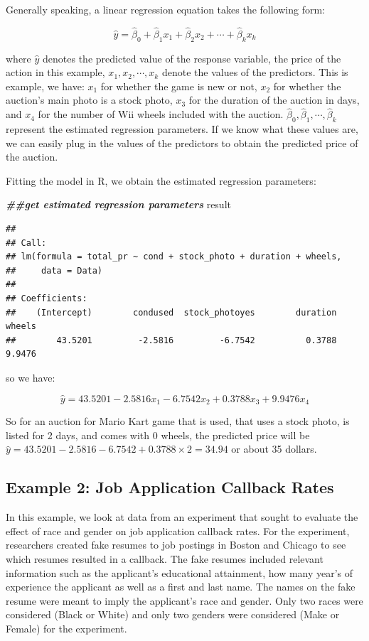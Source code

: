 \documentclass[
]{book}
\newenvironment{Shaded}{\begin{snugshade}}{\end{snugshade}}
\newcommand{\DocumentationTok}[1]{\textcolor[rgb]{0.56,0.35,0.01}{\textbf{\textit{#1}}}}
\newcommand{\NormalTok}[1]{#1}
\begin{document}
Generally speaking, a linear regression equation takes the following form:

\[
\hat{y} = \hat{\beta}_0 + \hat{\beta}_1 x_1 + \hat{\beta}_2 x_2 + \cdots + \hat{\beta}_k x_k
\]

where \(\hat{y}\) denotes the predicted value of the response variable, the price of the action in this example, \(x_1, x_2, \cdots, x_k\) denote the values of the predictors. This is example, we have: \(x_1\) for whether the game is new or not, \(x_2\) for whether the auction's main photo is a stock photo, \(x_3\) for the duration of the auction in days, and \(x_4\) for the number of Wii wheels included with the auction. \(\hat{\beta}_0, \hat{\beta}_1, \cdots, \hat{\beta}_k\) represent the estimated regression parameters. If we know what these values are, we can easily plug in the values of the predictors to obtain the predicted price of the auction.

Fitting the model in R, we obtain the estimated regression parameters:

\begin{Shaded}
\begin{Highlighting}[]
\DocumentationTok{\#\#get estimated regression parameters}
\NormalTok{result}
\end{Highlighting}
\end{Shaded}

\begin{verbatim}
## 
## Call:
## lm(formula = total_pr ~ cond + stock_photo + duration + wheels, 
##     data = Data)
## 
## Coefficients:
##    (Intercept)        condused  stock_photoyes        duration          wheels  
##        43.5201         -2.5816         -6.7542          0.3788          9.9476
\end{verbatim}

so we have:

\[
\hat{y} = 43.5201 - 2.5816 x_1 - 6.7542 x_2 + 0.3788 x_3 + 9.9476 x_4
\]

So for an auction for Mario Kart game that is used, that uses a stock photo, is listed for 2 days, and comes with 0 wheels, the predicted price will be \(\hat{y} = 43.5201 - 2.5816 - 6.7542 + 0.3788 \times 2 = 34.94\) or about 35 dollars.

\subsection{Example 2: Job Application Callback Rates}\label{eg2}

In this example, we look at data from an experiment that sought to evaluate the effect of race and gender on job application callback rates. For the experiment, researchers created fake resumes to job postings in Boston and Chicago to see which resumes resulted in a callback. The fake resumes included relevant information such as the applicant's educational attainment, how many year's of experience the applicant as well as a first and last name. The names on the fake resume were meant to imply the applicant's race and gender. Only two races were considered (Black or White) and only two genders were considered (Make or Female) for the experiment.
\end{document}
